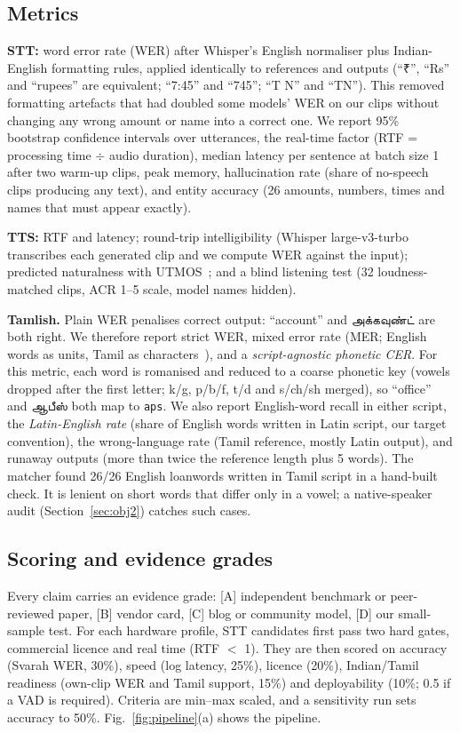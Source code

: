 \documentclass[conference]{IEEEtran}
\newcommand{\ta}[1]{#1}
\newcommand{\rupee}{{\tamilfont ₹}}
\begin{document}
\subsection{Metrics}
\label{sec:metrics}
\textbf{STT:} word error rate (WER) after Whisper's English normaliser plus Indian-English formatting rules, applied identically to references and outputs (``\rupee{}'', ``Rs'' and ``rupees'' are equivalent; ``7:45'' and ``745''; ``T N'' and ``TN''). This removed formatting artefacts that had doubled some models' WER on our clips without changing any wrong amount or name into a correct one. We report 95\% bootstrap confidence intervals over utterances, the real-time factor (RTF = processing time $\div$ audio duration), median latency per sentence at batch size 1 after two warm-up clips, peak memory, hallucination rate (share of no-speech clips producing any text), and entity accuracy (26 amounts, numbers, times and names that must appear exactly).

\textbf{TTS:} RTF and latency; round-trip intelligibility (Whisper large-v3-turbo transcribes each generated clip and we compute WER against the input); predicted naturalness with UTMOS~\cite{saeki2022utmos,gh_speechmos}; and a blind listening test (32 loudness-matched clips, ACR 1--5 scale, model names hidden).

\textbf{Tamlish.} Plain WER penalises correct output: ``account'' and \ta{அக்கவுண்ட்} are both right. We therefore report strict WER, mixed error rate (MER; English words as units, Tamil as characters~\cite{diwan2021mucs}), and a \emph{script-agnostic phonetic CER}. For this metric, each word is romanised and reduced to a coarse phonetic key (vowels dropped after the first letter; k/g, p/b/f, t/d and s/ch/sh merged), so ``office'' and \ta{ஆபீஸ்} both map to \texttt{aps}. We also report English-word recall in either script, the \emph{Latin-English rate} (share of English words written in Latin script, our target convention), the wrong-language rate (Tamil reference, mostly Latin output), and runaway outputs (more than twice the reference length plus 5 words). The matcher found 26/26 English loanwords written in Tamil script in a hand-built check. It is lenient on short words that differ only in a vowel; a native-speaker audit (Section~\ref{sec:obj2}) catches such cases.

\subsection{Scoring and evidence grades}
Every claim carries an evidence grade: [A] independent benchmark or peer-reviewed paper, [B] vendor card, [C] blog or community model, [D] our small-sample test. For each hardware profile, STT candidates first pass two hard gates, commercial licence and real time (RTF $<$ 1). They are then scored on accuracy (Svarah WER, 30\%), speed (log latency, 25\%), licence (20\%), Indian/Tamil readiness (own-clip WER and Tamil support, 15\%) and deployability (10\%; 0.5 if a VAD is required). Criteria are min--max scaled, and a sensitivity run sets accuracy to 50\%. Fig.~\ref{fig:pipeline}(a) shows the pipeline.
\end{document}
